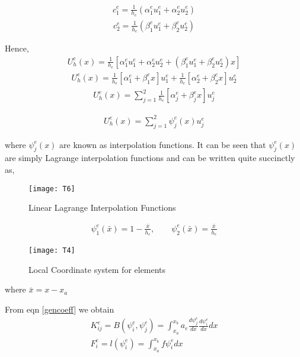 \begin{eqnarray}
	c_1^{e} = \frac{1}{h_e} (\alpha_1^e u_1^e + \alpha_2^e u_2^e)
\end{eqnarray}
\begin{eqnarray}
	c_2^{e} = \frac{1}{h_e} (\beta_1^eu_1^e + \beta_2^e u_2^e)
\end{eqnarray}

Hence,
\begin{eqnarray*}
	U_h^e(x) =  \frac{1}{h_e} [\alpha_1^e u_1^e + \alpha_2^e u_2^e + (\beta_1^eu_1^e + \beta_2^e u_2^e)x]
\end{eqnarray*}
\begin{eqnarray*}
	U_h^e(x) =  \frac{1}{h_e} [\alpha_1^e + \beta_1^e x] u_1^e + \frac{1}{h_e} [\alpha_2^e + \beta_2^e x] u_2^e
\end{eqnarray*}
\begin{eqnarray}
U_h^e(x) = \sum_{j=1}^{2} \frac{1}{h_e} [\alpha_j^e + \beta_j^e x] u_j^e 
\end{eqnarray}

\begin{eqnarray}
	U_h^e(x) = \sum_{j=1}^{2} \psi_j^e(x) u_j^e 
\end{eqnarray}

where $\psi_j^e(x)$ are known as interpolation functions. It can be seen that $\psi_j^e(x)$ are simply Lagrange interpolation functions and can be written quite succinctly as,
    \begin{figure}[h!]
	\centering
	\texttt{[image: T6]}
	\caption{Linear Lagrange Interpolation Functions}
\end{figure}
\begin{eqnarray}\label{locallagrange}
	\psi_1^e(\bar{x}) = 1 - \frac{\bar{x}}{h_e} , \quad\quad \psi_2^e(\bar{x}) = \frac{\bar{x}}{h_e}
\end{eqnarray}
    \begin{figure}[h!]
	\centering
	\texttt{[image: T4]}
	\caption{Local Coordinate system for elements}
\end{figure}
where $\bar{x} = x - x_a$

From eqn \ref{gencoeff} we obtain
\begin{eqnarray}
	K_{ij}^e = B(\psi_i^e , \psi_j^e) = \int_{x_a}^{x_b} a_e \frac{d\psi_j^e}{dx} \frac{d\psi_i^e}{dx} dx \\
	F_i^e = l(\psi_i^e) = \int_{x_a}^{x_b} f\psi_i^e dx
\end{eqnarray}

